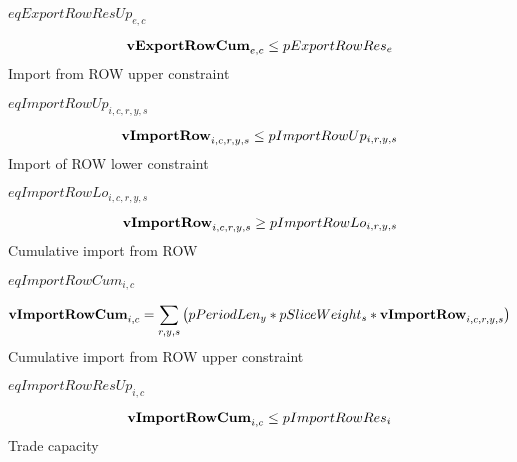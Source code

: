 \documentclass{article}
\begin{document}
$eqExportRowResUp_{e,c}$





\begin{dmath}
{\bf vExportRowCum}_{e,c}  \le  pExportRowRes_{e}
\end{dmath}
Import from ROW upper constraint







$eqImportRowUp_{i,c,r,y,s}$





\begin{dmath}
{\bf vImportRow}_{i,c,r,y,s}  \le  pImportRowUp_{i,r,y,s}
\end{dmath}
Import of ROW lower constraint







$eqImportRowLo_{i,c,r,y,s}$





\begin{dmath}
{\bf vImportRow}_{i,c,r,y,s}  \ge  pImportRowLo_{i,r,y,s}
\end{dmath}
Cumulative import from ROW







$eqImportRowCum_{i,c}$





\begin{dmath}
{\bf vImportRowCum}_{i,c}  =  \sum_{r,y,s}{\left(pPeriodLen_{y}*pSliceWeight_{s}*{\bf vImportRow}_{i,c,r,y,s}\right)}
\end{dmath}
Cumulative import from ROW upper constraint







$eqImportRowResUp_{i,c}$





\begin{dmath}
{\bf vImportRowCum}_{i,c}  \le  pImportRowRes_{i}
\end{dmath}
Trade capacity
\end{document}
